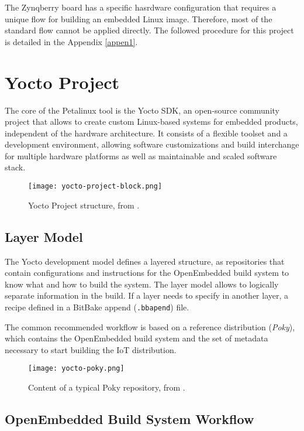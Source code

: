 The Zynqberry board has a specific hasrdware configuration that requires a unique flow for building
an embedded Linux image. Therefore, most of the standard flow cannot be applied directly. The
followed procedure for this project is detailed in the Appendix \ref{appen1}.

\section{Yocto Project}

The core of the Petalinux tool is the Yocto SDK, an open-source community project that allows to
create custom Linux-based systems for embedded products, independent of the hardware architecture.
It consists of a flexible toolset and a development environment, allowing software customizations
and build interchange for multiple hardware platforms as well as maintainable and scaled software
stack.

\begin{figure}[htp]
	\centering
	\texttt{[image: yocto-project-block.png]}
	\caption{Yocto Project structure, from \cite{yocto-manual}.} \label{fig:yocto-project-block}
\end{figure}

\subsection{Layer Model}

The Yocto development model defines a layered structure, as repositories that contain configurations
and instructions for the OpenEmbedded build system to know what and how to build the system. The
layer model allows to logically separate information in the build. If a layer needs to specify in
another layer, a recipe defined in a BitBake append (\texttt{.bbapend}) file.

The common recommended workflow is based on a reference distribution (\textit{Poky}), which contains
the OpenEmbedded build system and the set of metadata necessary to start building the IoT
distribution.

\begin{figure}[htp]
	\centering
	\texttt{[image: yocto-poky.png]}
	\caption{Content of a typical Poky repository, from \cite{yocto-manual}.} \label{fig:yocto-poky}
\end{figure}

\subsection{OpenEmbedded Build System Workflow}

